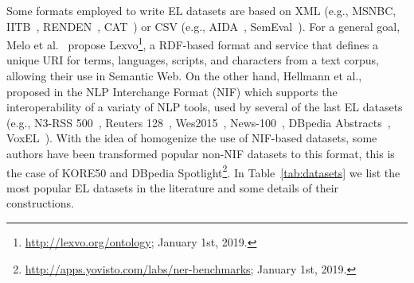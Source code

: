 \documentclass{llncs}
\begin{document}
Some formats employed to write EL datasets are based on XML (e.g., MSNBC, IITB~\cite{IITB2009}, RENDEN~\cite{renden2016}, CAT~\cite{meantime2016}) or CSV (e.g., AIDA~\cite{aida2011}, SemEval~\cite{moro2015semeval}). For a general goal, Melo et al.~\cite{Lexvo2008} propose Lexvo\footnote{\url{http://lexvo.org/ontology}; January 1st, 2019.}, a RDF-based format and service that defines a unique URI for terms, languages, scripts, and characters from a text corpus, allowing their use in Semantic Web. %
On the other hand, Hellmann et al., proposed in \cite{NIFpaper} the NLP Interchange Format (NIF) which supports the interoperability of a variaty of NLP tools, used by several of the last EL datasets (e.g., N3-RSS 500~\cite{N3}, Reuters 128~\cite{N3}, Wes2015~\cite{wes2015}, News-100~\cite{N3}, DBpedia Abstracts~\cite{abstracts2016}, VoxEL~\cite{VoxEL2018}). With the idea of homogenize the use of NIF-based datasets, some authors have been transformed popular non-NIF datasets to this format, this is the case of  KORE50 and DBpedia Spotlight\footnote{\url{http://apps.yovisto.com/labs/ner-benchmarks}; January 1st, 2019.}. In Table~\ref{tab:datasets} we list the most popular EL datasets in the literature and some details of their constructions.
\end{document}

